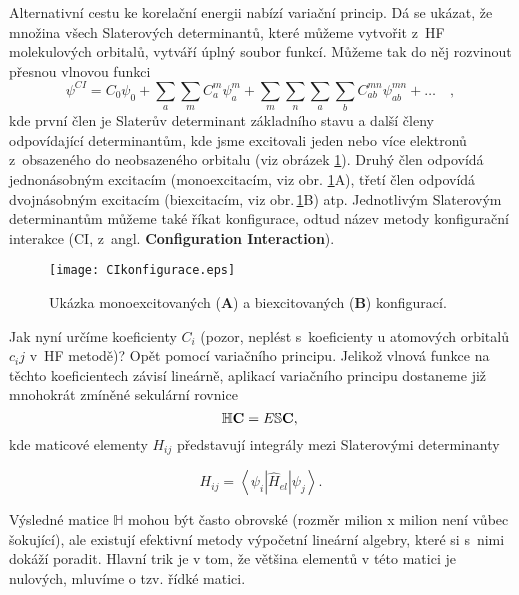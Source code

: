 Alternativní cestu ke korelační energii nabízí variační princip. Dá se ukázat, že množina všech Slaterových determinantů, které můžeme vytvořit z~HF molekulových orbitalů, vytváří úplný soubor funkcí. Můžeme tak do něj rozvinout přesnou vlnovou funkci 
\begin{equation}
\psi^{CI}=C_0\psi_0+\sum_a\sum_m C_a^m\psi_a^m+\sum_m \sum_n \sum_a \sum_b C_{ab}^{mn}\psi_{ab}^{mn}+\dots \quad ,
\label{rov:CIrozvoj}
\end{equation}
kde první člen je Slaterův determinant základního stavu a další členy odpovídající determinantům, kde jsme excitovali jeden nebo více elektronů z~obsazeného do neobsazeného orbitalu (viz obrázek \ref{obr:abinitio:ci}). Druhý člen odpovídá jednonásobným excitacím (monoexcitacím, viz obr. \ref{obr:abinitio:ci}A), třetí člen odpovídá dvojnásobným excitacím (biexcitacím,
viz obr.\,\ref{obr:abinitio:ci}B) atp. Jednotlivým Slaterovým determinantům můžeme také říkat konfigurace, odtud název metody konfigurační interakce (CI, z~angl. \textbf{Configuration Interaction}).

\begin{figure} [htb]
\centering
\texttt{[image: CIkonfigurace.eps]}
\caption[Excitované elektronové konfigurace]{Ukázka monoexcitovaných (\textbf{A}) a biexcitovaných (\textbf{B}) konfigurací.}
\label{obr:abinitio:ci}
\end{figure}

Jak nyní určíme koeficienty $C_i$ (pozor, neplést s~koeficienty u atomových orbitalů $c_ij$ v~HF metodě)? Opět pomocí variačního principu. Jelikož vlnová funkce na těchto koeficientech závisí lineárně, aplikací variačního principu dostaneme již mnohokrát zmíněné sekulární rovnice
\begin{equation}
\mathbb{H}\mathbf{C}=E\mathbb{S}\mathbf{C} \nonumber ,\\
\end{equation}
kde maticové elementy $H_{ij}$ představují integrály mezi Slaterovými determinanty

\begin{equation}
H_{ij}= \left\langle \psi_i | \hat{H}_{el} | \psi_j \right\rangle.
\end{equation}

Výsledné matice $\mathbb{H}$ mohou být často obrovské (rozměr milion x milion není vůbec šokující), ale existují efektivní metody výpočetní lineární algebry, které si s~nimi dokáží poradit. Hlavní trik je v tom, že většina elementů v této matici je nulových, mluvíme o tzv. řídké matici. 

